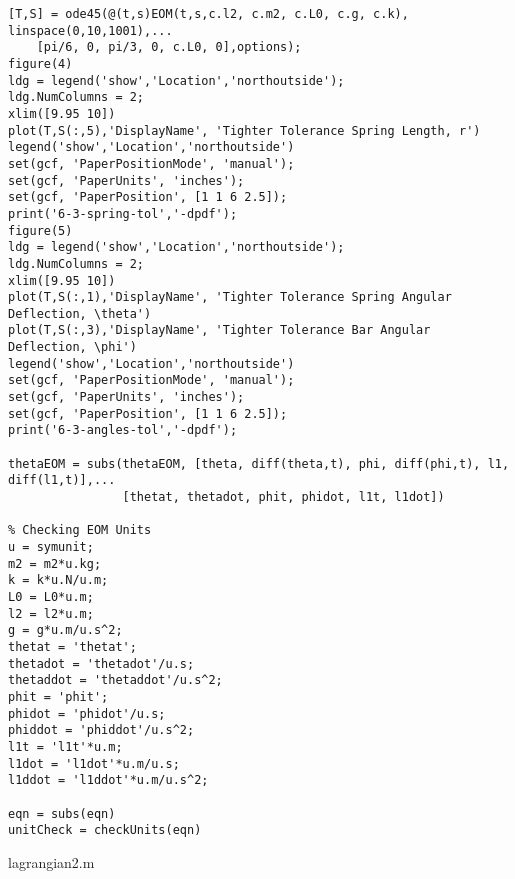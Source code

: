 \begin{lstlisting}[frame=lines,style=Matlab-editor,basicstyle = \mlttfamily]
%-------------------------------------------------------------------------%
[T,S] = ode45(@(t,s)EOM(t,s,c.l2, c.m2, c.L0, c.g, c.k), linspace(0,10,1001),...
    [pi/6, 0, pi/3, 0, c.L0, 0],options);
figure(4)
ldg = legend('show','Location','northoutside');
ldg.NumColumns = 2;
xlim([9.95 10])
plot(T,S(:,5),'DisplayName', 'Tighter Tolerance Spring Length, r')
legend('show','Location','northoutside')
set(gcf, 'PaperPositionMode', 'manual');
set(gcf, 'PaperUnits', 'inches');
set(gcf, 'PaperPosition', [1 1 6 2.5]);
print('6-3-spring-tol','-dpdf');
figure(5)
ldg = legend('show','Location','northoutside');
ldg.NumColumns = 2;
xlim([9.95 10])
plot(T,S(:,1),'DisplayName', 'Tighter Tolerance Spring Angular Deflection, \theta')
plot(T,S(:,3),'DisplayName', 'Tighter Tolerance Bar Angular Deflection, \phi')
legend('show','Location','northoutside')
set(gcf, 'PaperPositionMode', 'manual');
set(gcf, 'PaperUnits', 'inches');
set(gcf, 'PaperPosition', [1 1 6 2.5]);
print('6-3-angles-tol','-dpdf');

thetaEOM = subs(thetaEOM, [theta, diff(theta,t), phi, diff(phi,t), l1, diff(l1,t)],...
                [thetat, thetadot, phit, phidot, l1t, l1dot])

% Checking EOM Units
u = symunit;
m2 = m2*u.kg;
k = k*u.N/u.m;
L0 = L0*u.m;
l2 = l2*u.m;
g = g*u.m/u.s^2;
thetat = 'thetat';
thetadot = 'thetadot'/u.s;
thetaddot = 'thetaddot'/u.s^2;
phit = 'phit';
phidot = 'phidot'/u.s;
phiddot = 'phiddot'/u.s^2;
l1t = 'l1t'*u.m;
l1dot = 'l1dot'*u.m/u.s;
l1ddot = 'l1ddot'*u.m/u.s^2;

eqn = subs(eqn)
unitCheck = checkUnits(eqn)
\end{lstlisting}
lagrangian2.m
